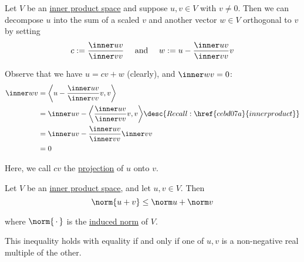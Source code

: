\label{a7dfcb8}

Let $V$ be an \href{b9935c8}{inner product space} and suppose $u,v\in V$ with
$v\neq0$. Then we can decompose $u$ into the sum of a scaled $v$ and another
vector $w\in V$ orthogonal to $v$ by setting
$$
  c:=\frac{\inner uv}{\inner vv}\quad\text{ and }\quad w:=u-\frac{\inner uv}{\inner vv}v
$$

Observe that we have $u=cv+w$ (clearly), and $\inner wv=0$:
\begin{align*}
  \inner wv &=\biggl\langle u-\frac{\inner uv}{\inner vv}v,v\biggr\rangle                                                    \\
            &=\inner uv-\biggl\langle\frac{\inner uv}{\inner vv}v,v\biggr\rangle\desc{Recall: \href{cebd07a}{inner product}} \\
            &=\inner uv-\frac{\inner uv}{\inner vv}\inner vv                                                                 \\
            &=0
\end{align*}

Here, we call $cv$ the \href{fc332ef}{projection} of $u$ onto $v$.

\label{f5f1056}

Let $V$ be an \href{b9935c8}{inner product space}, and let $u,v\in V$. Then
$$
  \norm{u+v}\leq\norm u+\norm v
$$

where $\norm{\,\cdot\,}$ is the \href{d828dac}{induced norm} of $V$.

This inequality holds with equality if and only if one of $u,v$ is a
non-negative real multiple of the other.

